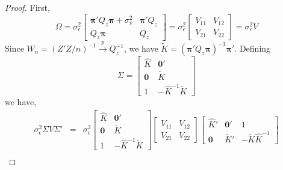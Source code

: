 \documentclass[12pt]{article}
\theoremstyle{definition}
\begin{document}
\begin{proof}
First,
$$\Omega = \sigma_\epsilon^2\left[ \begin{array}{cc}
\boldsymbol{\pi}'Q_z \boldsymbol{\pi}  +\sigma^2_v 
&\boldsymbol{\pi}'Q_z\\
  Q_z \boldsymbol{\pi}&Q_z
  \end{array}\right] = \sigma_\epsilon^2\left[
  \begin{array}{cc}
  V_{11} & V_{12} \\ V_{21} & V_{22}
  \end{array}
  \right]=\sigma_\epsilon^2 V$$
  Since $W_n = (Z'Z/n)^{-1}\overset{p}{\rightarrow} Q_z^{-1}$, we have $\widetilde{K} = \left(\boldsymbol{\pi}'Q_z \boldsymbol{\pi}\right)^{-1}\boldsymbol{\pi}'$. 
Defining
  $$\Sigma = \left[\begin{array}{cc}
\widehat{K} & \mathbf{0}'\\
  \mathbf{0} & \widetilde{K}\\
  1 & -\widehat{K}^{-1} \widetilde{K}
  \end{array}
  \right]$$
we have,
  \begin{eqnarray*}
    \sigma_\epsilon^2 \Sigma V \Sigma' &=&
    \sigma_\epsilon^2 
    \left[\begin{array}{cc}
\widehat{K} & \mathbf{0}'\\
  \mathbf{0} & \widetilde{K}\\
  1 & -\widehat{K}^{-1} \widetilde{K}
  \end{array}
  \right]
    \left[
  \begin{array}{cc}
  V_{11} & V_{12} \\ V_{21} & V_{22}
  \end{array}
  \right]
    \left[
    \begin{array}{ccc}
      \widehat{K}'& \mathbf{0}' &1 \\ 
      \mathbf{0}&\widetilde{K}' &-\widetilde{K}\widehat{K}^{-1}
    \end{array}
    \right]\\

\end{eqnarray*}
\end{proof}
\end{document}
